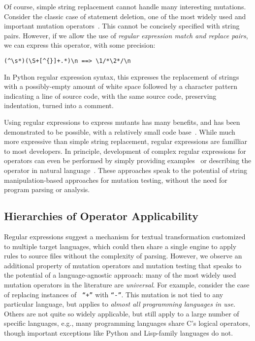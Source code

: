 \documentclass[acmsmall,screen,review,anonymous]{acmart}
\begin{document}
Of course, simple string replacement cannot handle
many interesting mutations.  Consider the classic case of statement
deletion, one of the most widely used and important mutation
operators~\cite{deng2013empirical}. This cannot be concisely specified with string pairs. 
However, if we allow the use of
\emph{regular expression match and replace pairs}, we can express this operator, with some precision:

\begin{verbatim}
(^\s*)(\S+[^{}]+.*)\n ==> \1/*\2*/\n
\end{verbatim}

In Python regular expression syntax, this expresses the replacement of
strings with a possibly-empty amount of white space followed by a
character pattern indicating a line of source code, with the same
source code, preserving indentation, turned into a comment.

Using regular expressions to express mutants has many benefits, and
has been demonstrated to be possible, with a relatively small code base~\cite{regexpMut}.  While
much more expressive than simple string replacement, regular
expressions are familliar to most developers.  In principle,
development of complex regular expressions for operators can even be
performed by simply providing examples~\cite{bartoli2014automatic}  or
describing the operator in natural
language~\cite{zhong2018generating}.  
These approaches speak to the potential of string manipulation-based approaches
for mutation testing, without the need for program parsing or analysis. 


\subsection{Hierarchies of Operator Applicability}

Regular expressions suggest a mechanism for textual transformation customized to
multiple target languages, which could then share a single engine to apply rules
to source files without the complexity of parsing. 
However, we observe an additional property of mutation operators and mutation
testing that speaks to the potential of a language-agnostic approach: many of the
most widely used mutation operators in the literature are \emph{universal}.  For
example, consider the case of replacing instances of {\tt
  ``+''}  with {\tt ``-''}.  This mutation is not tied to any
particular language, but applies to \emph{almost all programming
  languages in use.}  Others are not quite
so widely applicable, but still apply to a large number of specific
languages, e.g., many programming languages share C's logical
operators, though important exceptions like Python and Lisp-family
languages do not.
\end{document}
